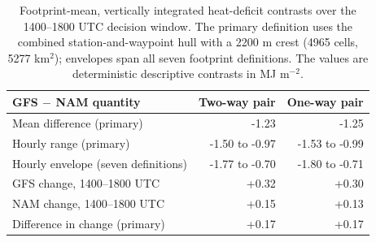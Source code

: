 \documentclass[air,article,submit,moreauthors]{Definitions/mdpi}
\begin{document}
\begin{table}[H]
\caption{Footprint-mean, vertically integrated heat-deficit contrasts over the 1400--1800 UTC decision window.
The primary definition uses the combined station-and-waypoint hull with a 2200 m crest (4965 cells, 5277 km$^{2}$); envelopes span all seven footprint definitions.
The values are deterministic descriptive contrasts in MJ m$^{-2}$.}
\label{tab:v3-heatdeficit}
\centering
\begin{tabular}{lrr}
\toprule
GFS $-$ NAM quantity & Two-way pair & One-way pair \\
\midrule
Mean difference (primary) & -1.23 & -1.25 \\
Hourly range (primary) & -1.50 to -0.97 & -1.53 to -0.99 \\
Hourly envelope (seven definitions) & -1.77 to -0.70 & -1.80 to -0.71 \\
GFS change, 1400--1800 UTC & +0.32 & +0.30 \\
NAM change, 1400--1800 UTC & +0.15 & +0.13 \\
Difference in change (primary) & +0.17 & +0.17 \\
\bottomrule
\end{tabular}
\end{table}

\vspace{6pt}
\end{document}

